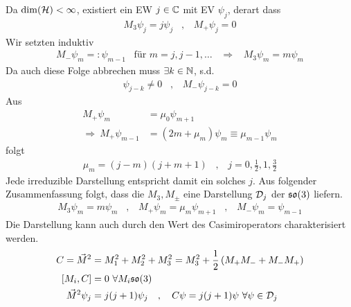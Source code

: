Da $\dim (\mathcal{H}) < \infty$, existiert ein EW $j \in \mathbb{C}$ mit EV $\psi_j$, derart dass
\begin{align*}
    M_3 \psi_j = j \psi_j
    \hspace{10pt} , \hspace{10pt}
    M_+ \psi_j = 0
\end{align*}
Wir setzten induktiv
\begin{align*}
    M_- \psi_m =: \psi_{m-1}
    \hspace{10pt} \text{für } m = j,j-1,\dots
    \hspace{10pt} \Rightarrow \hspace{10pt}
    M_3 \psi_m = m \psi_m
\end{align*}
Da auch diese Folge abbrechen muss $\exists k \in \mathbb{N}$, s.d.
\begin{align*}
    \psi_{j-k} \neq 0
    \hspace{10pt} , \hspace{10pt}
    M_- \psi_{j-k} = 0
\end{align*}
Aus
\begin{align*}
    M_+ \psi_m &= \mu_0 \psi_{m+1}
    \\
    \Rightarrow \
    M_+ \psi_{m-1} &= (2m+\mu_m) \psi_m
    \equiv \mu_{m-1} \psi_m
\end{align*}
folgt
\begin{align*}
    \mu_m = (j-m)(j+m+1)
    \hspace{10pt} , \hspace{10pt}
    j = 0 , \frac{1}{2} , 1 , \frac{3}{2}
\end{align*}
Jede irreduzible Darstellung entspricht damit ein solches $j$. Aus folgender
Zusammenfassung folgt, dass die $M_3,M_{\pm}$ eine Darstellung $\mathcal{D}_j$ der $\mathfrak{so}(3)$
liefern.
\begin{align*}
    M_3 \psi_m = m \psi_m
    \hspace{10pt} , \hspace{10pt}
    M_+ \psi_m = \mu_m \psi_{m+1}
    \hspace{10pt} , \hspace{10pt}
    M_- \psi_m = \psi_{m-1}
\end{align*}
Die Darstellung kann auch durch den Wert des Casimiroperators charakterisiert
werden.
\begin{align*}
    C = \vec{M}^2 &= M_1^2 + M_2^2 + M_3^2
    = M_3^2 + \frac{1}{2} \left( M_+ M_- + M_- M_+ \right)
    \\
    \left[ M_i,C \right] &= 0 \ \forall M_i \mathfrak{so}(3)
    \\
    \vec{M}^2 \psi_j &= j(j+1) \psi_j
    \hspace{10pt} , \hspace{10pt} C \psi = j(j+1) \psi \ \forall \psi \in \mathcal{D}_j
\end{align*}
